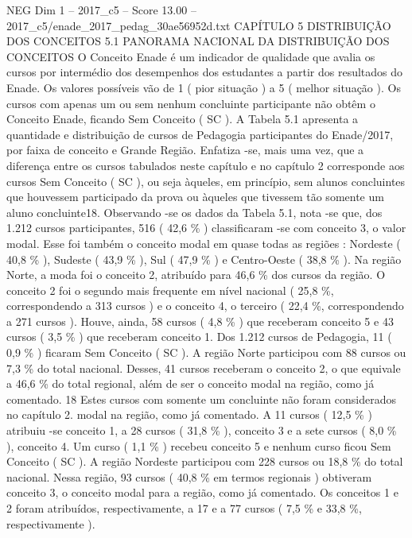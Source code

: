 \begin{textsample}{NEG Dim 1 – 2017\_c5 – Score 13.00 – 2017\_c5/enade\_2017\_pedag\_30ae56952d.txt}  \label{ex:f1_neg_386}
CAPÍTULO 5 DISTRIBUIÇÃO DOS CONCEITOS 5.1 PANORAMA NACIONAL DA DISTRIBUIÇÃO DOS CONCEITOS O Conceito Enade é um indicador de qualidade que avalia os cursos por intermédio dos desempenhos dos estudantes a partir dos resultados do Enade.
Os valores possíveis vão de 1 ( pior situação ) a 5 ( melhor situação ).
Os cursos com apenas um ou sem nenhum concluinte participante não obtêm o Conceito Enade, ficando Sem Conceito ( SC ).
A Tabela 5.1 apresenta a quantidade e distribuição de cursos de Pedagogia participantes do Enade/2017, por faixa de conceito e Grande Região.
Enfatiza -se, mais uma vez, que a diferença entre os cursos tabulados neste capítulo e no capítulo 2 corresponde aos cursos Sem Conceito ( SC ), ou seja àqueles, em princípio, sem alunos concluintes que houvessem participado da prova ou àqueles que tivessem tão somente um aluno concluinte18.
Observando -se os dados da Tabela 5.1, nota -se que, dos 1.212 cursos participantes, 516 ( 42,6 \% ) classificaram -se com conceito 3, o valor modal.
Esse foi também o conceito modal em quase todas as regiões : Nordeste ( 40,8 \% ), Sudeste ( 43,9 \% ), Sul ( 47,9 \% ) e Centro-Oeste ( 38,8 \% ).
Na região Norte, a moda foi o conceito 2, atribuído para 46,6 \% dos cursos da região.
O conceito 2 foi o segundo mais frequente em nível nacional ( 25,8 \%, correspondendo a 313 cursos ) e o conceito 4, o terceiro ( 22,4 \%, correspondendo a 271 cursos ).
Houve, ainda, 58 cursos ( 4,8 \% ) que receberam conceito 5 e 43 cursos ( 3,5 \% ) que receberam conceito 1.
Dos 1.212 cursos de Pedagogia, 11 ( 0,9 \% ) ficaram Sem Conceito ( SC ).
A região Norte participou com 88 cursos ou 7,3 \% do total nacional.
Desses, 41 cursos receberam o conceito 2, o que equivale a 46,6 \% do total regional, além de ser o conceito modal na região, como já comentado. 18 Estes cursos com somente um concluinte não foram considerados no capítulo 2. modal na região, como já comentado.
A 11 cursos ( 12,5 \% ) atribuiu -se conceito 1, a 28 cursos ( 31,8 \% ), conceito 3 e a sete cursos ( 8,0 \% ), conceito 4.
Um curso ( 1,1 \% ) recebeu conceito 5 e nenhum curso ficou Sem Conceito ( SC ).
A região Nordeste participou com 228 cursos ou 18,8 \% do total nacional.
Nessa região, 93 cursos ( 40,8 \% em termos regionais ) obtiveram conceito 3, o conceito modal para a região, como já comentado.
Os conceitos 1 e 2 foram atribuídos, respectivamente, a 17 e a 77 cursos ( 7,5 \% e 33,8 \%, respectivamente ).

\end{textsample}
